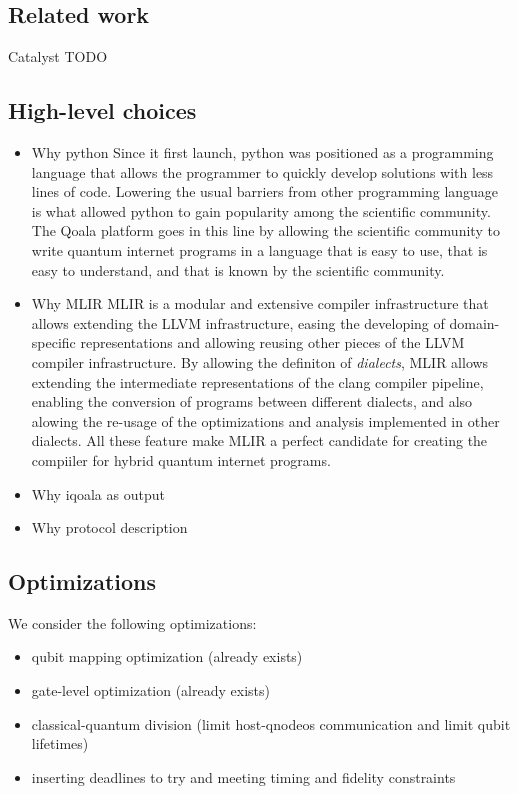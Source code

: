 \subsection{Related work}
Catalyst
TODO

\subsection{High-level choices}
\begin{itemize}
\item Why python
  Since it first launch, python was positioned as a programming language that allows the programmer to quickly develop
  solutions with less lines of code. Lowering the usual barriers from other programming language is what allowed python
  to gain popularity among the scientific community.
  The Qoala platform goes in this line by allowing the scientific community to write quantum internet programs in a
  language that is easy to use, that is easy to understand, and that is known by the scientific community.
\item Why MLIR
  MLIR is a modular and extensive compiler infrastructure that allows extending the LLVM infrastructure, easing the
  developing of domain-specific representations and allowing reusing other pieces of the LLVM compiler infrastructure.
  By allowing the definiton of \textit{dialects}, MLIR allows extending the intermediate representations of the clang compiler
  pipeline, enabling the conversion of programs between different dialects, and also alowing the re-usage of the
  optimizations and analysis implemented in other dialects.
  All these feature make MLIR a perfect candidate for creating the compiiler for hybrid quantum internet programs.
\item Why iqoala as output
\item Why protocol description
\end{itemize}
    

\subsection{Optimizations}
We consider the following optimizations:
\begin{itemize}
\item qubit mapping optimization (already exists)
\item gate-level optimization (already exists)
\item classical-quantum division (limit host-qnodeos communication and limit qubit lifetimes)
\item inserting deadlines to try and meeting timing and fidelity constraints
\end{itemize}


